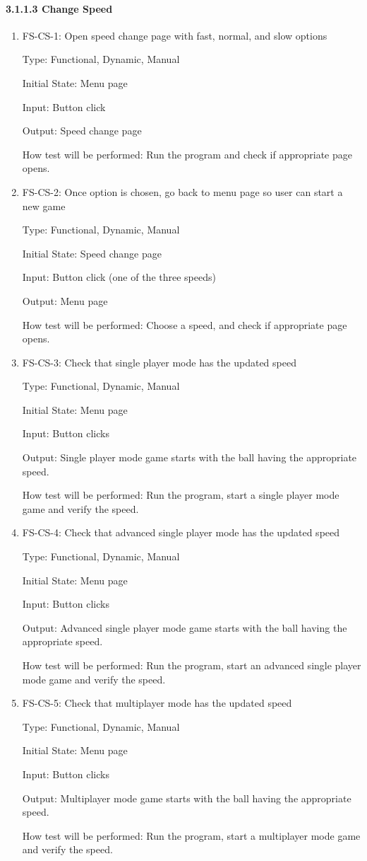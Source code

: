 \documentclass[12pt,letterpaper]{article}
\begin{document}
	\paragraph{3.1.1.3 Change Speed}
	\begin{enumerate}
	\item FS-CS-1: Open speed change page with fast, normal, and slow options

	Type: Functional, Dynamic, Manual

	Initial State: Menu page

	Input: Button click

	Output: Speed change page

	How test will be performed: Run the program and check if appropriate page opens.

	\item FS-CS-2: Once option is chosen, go back to menu page so user can start a new game

	Type: Functional, Dynamic, Manual

	Initial State: Speed change page

	Input: Button click (one of the three speeds)	

	Output: Menu page

	How test will be performed: Choose a speed, and check if appropriate page opens.

	\item FS-CS-3: Check that single player mode has the updated speed

	Type: Functional, Dynamic, Manual

	Initial State: Menu page

	Input: Button clicks	

	Output: Single player mode game starts with the ball having the appropriate speed.

	How test will be performed: Run the program, start a single player mode game and verify the speed.

	\item FS-CS-4: Check that advanced single player mode has the updated speed

	Type: Functional, Dynamic, Manual

	Initial State: Menu page

	Input: Button clicks

	Output: Advanced single player mode game starts with the ball having the appropriate speed.

	How test will be performed: Run the program, start an advanced single player mode game and verify the speed.

	\item FS-CS-5: Check that multiplayer mode has the updated speed

	Type: Functional, Dynamic, Manual

	Initial State: Menu page

	Input: Button clicks

	Output: Multiplayer mode game starts with the ball having the appropriate speed.

	How test will be performed: Run the program, start a multiplayer mode game and verify the speed.
	\end{enumerate}
\end{document}
